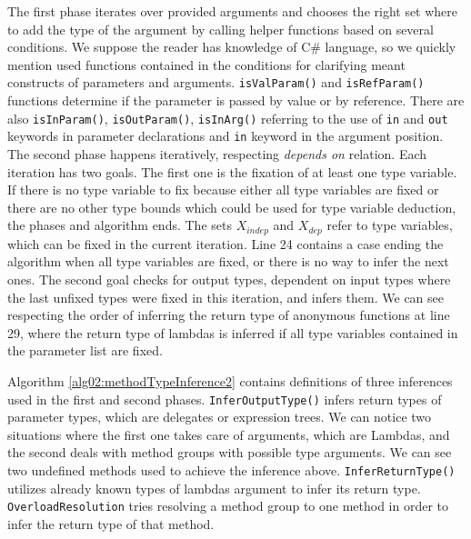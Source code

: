 \par
{}
The first phase iterates over provided arguments and chooses the right set where to add the type of the argument by calling helper functions based on several conditions.
We suppose the reader has knowledge of C\# language, so we quickly mention used functions contained in the conditions for clarifying meant constructs of parameters and arguments.
\texttt{isValParam()} and \texttt{isRefParam()} functions determine if the parameter is passed by value or by reference.
There are also \texttt{isInParam()}, \texttt{isOutParam()}, \texttt{isInArg()} referring to the use of \texttt{in} and \texttt{out} keywords in parameter declarations and \texttt{in} keyword in the argument position.
The second phase happens iteratively, respecting \textit{depends on} relation.
Each iteration has two goals.
The first one is the fixation of at least one type variable.
If there is no type variable to fix because either all type variables are fixed or there are no other type bounds which could be used for type variable deduction, the phases and algorithm ends.
The sets \texttt{$X_{indep}$} and \texttt{$X_{dep}$} refer to type variables, which can be fixed in the current iteration.
Line 24 contains a case ending the algorithm when all type variables are fixed, or there is no way to infer the next ones.
The second goal checks for output types, dependent on input types where the last unfixed types were fixed in this iteration, and infers them.
We can see respecting the order of inferring the return type of anonymous functions at line 29, where the return type of lambdas is inferred if all type variables contained in the parameter list are fixed.
\par
{}
Algorithm \ref{alg02:methodTypeInference2} contains definitions of three inferences used in the first and second phases.
\texttt{InferOutputType()} infers return types of parameter types, which are delegates or expression trees.
We can notice two situations where the first one takes care of arguments, which are Lambdas, and the second deals with method groups with possible type arguments. 
We can see two undefined methods used to achieve the inference above.
\texttt{InferReturnType()} utilizes already known types of lambdas argument to infer its return type.
\texttt{OverloadResolution} tries resolving a method group to one method in order to infer the return type of that method.
\par
{}
